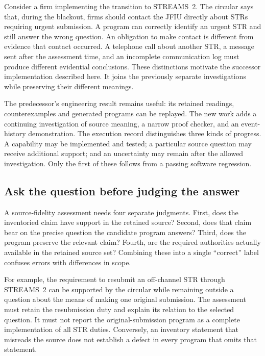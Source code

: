 \documentclass[12pt,a4paper,oneside,openany]{book}
\begin{document}
Consider a firm implementing the transition to STREAMS~2. The circular says
that, during the blackout, firms should contact the JFIU directly about STRs
requiring urgent submission. A program can correctly identify an urgent STR
and still answer the wrong question. An obligation to make contact is different
from evidence that contact occurred. A telephone call about another STR, a
message sent after the assessment time, and an incomplete communication log
must produce different evidential conclusions. These distinctions motivate
the successor implementation described here. It joins the previously separate
investigations while preserving their different meanings.

The predecessor's engineering result remains useful: its retained readings,
counterexamples and generated programs can be replayed. The new work adds a
continuing investigation of source meaning, a narrow proof checker, and an
event-history demonstration. The execution record distinguishes three kinds
of progress. A capability may be implemented and tested; a particular source
question may receive additional support; and an uncertainty may remain after
the allowed investigation. Only the first of these follows from a passing
software regression.

\subsection{Ask the question before judging the answer}

A source-fidelity assessment needs four separate judgments. First, does the
inventoried claim have support in the retained source? Second, does that claim
bear on the precise question the candidate program answers? Third, does the
program preserve the relevant claim? Fourth, are the required authorities
actually available in the retained source set? Combining these into a single
``correct'' label confuses errors with differences in scope.

For example, the requirement to resubmit an off-channel STR through STREAMS~2
can be supported by the circular while remaining outside a question about the
means of making one original submission. The assessment must retain the
resubmission duty and explain its relation to the selected question. It must
not report the original-submission program as a complete implementation of
all STR duties. Conversely, an inventory statement that misreads the source
does not establish a defect in every program that omits that statement.
\end{document}
